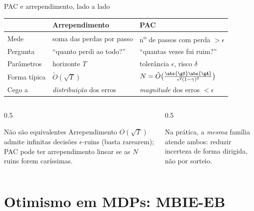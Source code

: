 \documentclass[aspectratio=169, 11pt]{beamer}
\begin{document}
\begin{frame}{PAC e arrependimento, lado a lado}
  \centering
  \small
  \begin{tabular}{@{}l>{\raggedright\arraybackslash}p{}>{\raggedright\arraybackslash}p{}@{}}
    \toprule
    & \textbf{Arrependimento} & \textbf{PAC} \\
    \midrule
    Mede         & soma das perdas por passo & n\textsuperscript{o} de passos com perda $>\epsilon$ \\
    Pergunta     & ``quanto perdi ao todo?'' & ``quantas vezes fui ruim?'' \\
    Parâmetros   & horizonte $T$ & tolerância $\epsilon$, risco $\delta$ \\
    Forma típica & $\tilde{O}(\sqrt{T})$ & $N=\tilde{O}\bigl(\tfrac{\abs{\gS}\abs{\gA}}{\epsilon^{2}(1-\gamma)^{3}}\bigr)$ \\
    Cego a       & \emph{distribuição} dos erros & \emph{magnitude} dos erros $<\epsilon$ \\
    \bottomrule
  \end{tabular}
  \vspace{0.6em}
  \begin{columns}[T]
    \begin{column}{0.5\textwidth}
      \begin{teobox}{Não são equivalentes}
        Arrependimento $O(\sqrt{T})$ admite infinitas decisões $\epsilon$-ruins (basta
        rarearem); PAC pode ter arrependimento linear se as $N$ ruins forem caríssimas.
      \end{teobox}
    \end{column}
    \begin{column}{0.5\textwidth}
      \begin{ideiabox}
        Na prática, a \emph{mesma} família atende ambos: reduzir incerteza de forma
        \alert{dirigida}, não por sorteio.
      \end{ideiabox}
    \end{column}
  \end{columns}
\end{frame}
\section{Otimismo em MDPs: MBIE-EB}
\end{document}
